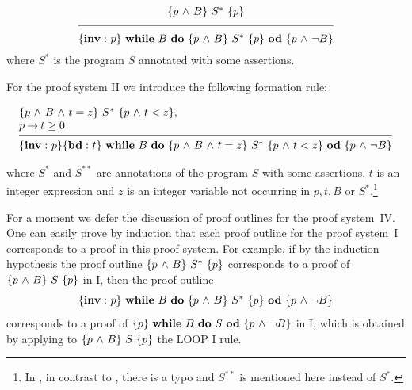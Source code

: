 \documentclass[manuscript, screen, review]{acmart}
\begin{document}
\[
\frac{\raisebox{2mm}{$ \HT{p \A B}{S^*}{p}$}}
            {\raisebox{-2mm}{$\HT{{\bf inv:}\ p}
                 {\WDD{B}{\HT{p \A B}{S^*}{p}}}
                 {p \A \neg B}$}}
\]
where $S^*$ is the program $S$ annotated with some assertions.
\III

For the proof system II we introduce the following formation rule:
\III

\NI
\[
\begin{array}{l}
\HT{p \A B \A t=z}{S^{*}}{p \A t<z},                    \\
p \ra t \geq 0                                          \\
[-\medskipamount]
\hrulefill                                              \\
\Cu{{\bf inv:}\ p}
\HT{{\bf bd:}\ t}
   {\WDD{B}{\HT{p \A B \A t = z}{S^*}{p \A t<z}}}
   {p \A \neg B}
\end{array}
\]

\NI
where $S^*$ and $S^{**}$ are annotations of
the program $S$ with some assertions, 
$t$ is an integer expression and $z$ is an integer variable
not occurring in $p,t,B$ or $S^{*}$.\footnote{In \cite{ABO09}, in contrast to \cite{ABO90},
there is a typo and $S^{**}$ is mentioned here instead of $S^{*}$.}
\III




For a moment we defer the discussion of proof outlines for the proof
system~IV.  One can easily prove by induction that each proof outline
for the proof system~I corresponds to a proof in this proof
system. For example, if by the induction hypothesis the proof outline
$\mbox{$\{{p \mbox{$\ \wedge\ $} B}\}\ {S^*}\ \{{p}\}$}$ corresponds to a proof of $\mbox{$\{{p \mbox{$\ \wedge\ $} B}\}\ {S}\ \{{p}\}$}$ in
I, then the proof outline
\[
  \HT{{\bf inv:}\ p}{\WDD{B}{\HT{p \A B}{S^*}{p}}}{p \A \neg B}
\]
corresponds to a proof of $\mbox{$\{{p}\}\ {\mbox{$\mbox{{\bf while}\ } {B}\ \mbox{{\bf do}\ } {S}\ \mbox{{\bf od}}$}}\ \{{p \mbox{$\ \wedge\ $} \neg B}\}$}$ in I,
which is obtained by applying to $\mbox{$\{{p \mbox{$\ \wedge\ $} B}\}\ {S}\ \{{p}\}$}$ the LOOP I rule.
\end{document}
